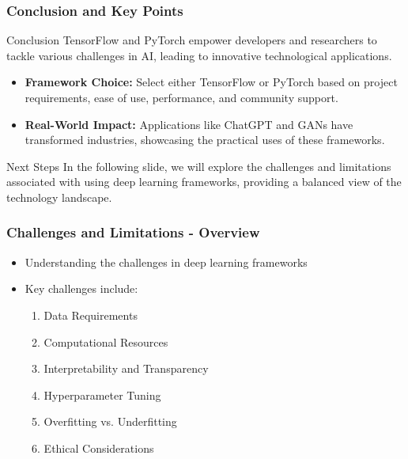 \documentclass[aspectratio=169]{beamer}
\begin{document}
\begin{frame}
    \frametitle{Conclusion and Key Points}
    \begin{block}{Conclusion}
        TensorFlow and PyTorch empower developers and researchers to tackle various challenges in AI, leading to innovative technological applications.
    \end{block}

    \begin{itemize}
        \item \textbf{Framework Choice:} Select either TensorFlow or PyTorch based on project requirements, ease of use, performance, and community support.
        \item \textbf{Real-World Impact:} Applications like ChatGPT and GANs have transformed industries, showcasing the practical uses of these frameworks.
    \end{itemize}

    \begin{block}{Next Steps}
        In the following slide, we will explore the challenges and limitations associated with using deep learning frameworks, providing a balanced view of the technology landscape.
    \end{block}
\end{frame}

\begin{frame}[fragile]
    \frametitle{Challenges and Limitations - Overview}
    \begin{itemize}
        \item Understanding the challenges in deep learning frameworks
        \item Key challenges include:
        \begin{enumerate}
            \item Data Requirements
            \item Computational Resources
            \item Interpretability and Transparency
            \item Hyperparameter Tuning
            \item Overfitting vs. Underfitting
            \item Ethical Considerations
        \end{enumerate}
    \end{itemize}
\end{frame}
\end{document}
